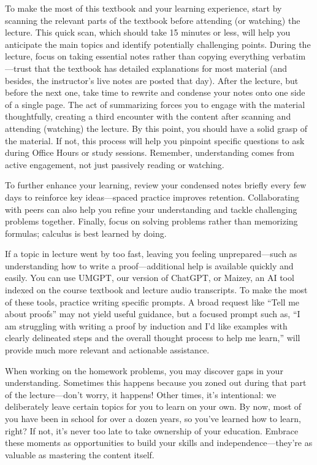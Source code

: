 To make the most of this textbook and your learning experience, start by scanning the relevant parts of the textbook before attending (or watching) the lecture. This quick scan, which should take 15 minutes or less, will help you anticipate the main topics and identify potentially challenging points. During the lecture, focus on taking essential notes rather than copying everything verbatim—trust that the textbook has detailed explanations for most material (and besides, the instructor's live notes are posted that day). After the lecture, but before the next one, take time to rewrite and condense your notes onto one side of a single page. The act of summarizing forces you to engage with the material thoughtfully, creating a third encounter with the content after scanning and attending (watching) the lecture. By this point, you should have a solid grasp of the material. If not, this process will help you pinpoint specific questions to ask during Office Hours or study sessions. Remember, understanding comes from active engagement, not just passively reading or watching.

To further enhance your learning, review your condensed notes briefly every few days to reinforce key ideas—spaced practice improves retention. Collaborating with peers can also help you refine your understanding and tackle challenging problems together. Finally, focus on solving problems rather than memorizing formulas; calculus is best learned by doing.

If a topic in lecture went by too fast, leaving you feeling unprepared—such as understanding how to write a proof—additional help is available quickly and easily. You can use UMGPT, our version of ChatGPT, or Maizey, an AI tool indexed on the course textbook and lecture audio transcripts. To make the most of these tools, practice writing specific prompts. A broad request like ``Tell me about proofs'' may not yield useful guidance, but a focused prompt such as, ``I am struggling with writing a proof by induction and I'd like examples with clearly delineated steps and the overall thought process to help me learn,'' will provide much more relevant and actionable assistance.

When working on the homework problems, you may discover gaps in your understanding. Sometimes this happens because you zoned out during that part of the lecture—don’t worry, it happens! Other times, it’s intentional: we deliberately leave certain topics for you to learn on your own. By now, most of you have been in school for over a dozen years, so you’ve learned how to learn, right? If not, it’s never too late to take ownership of your education. Embrace these moments as opportunities to build your skills and independence—they’re as valuable as mastering the content itself.

